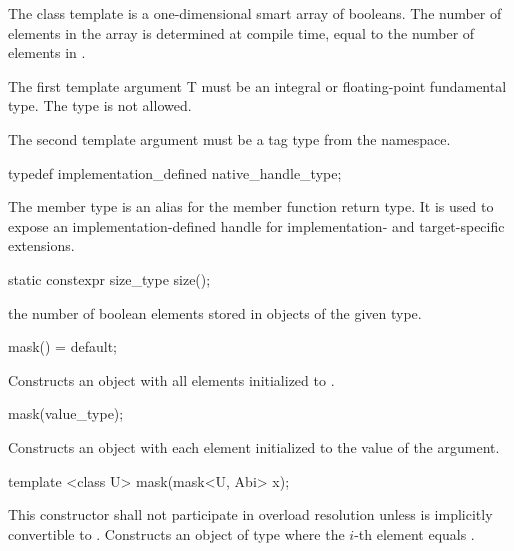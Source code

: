 

\pnum The class template \mask[<T, Abi>] is a one-dimensional smart array of booleans.
The number of elements in the array is determined at compile time, equal to the number of elements in \datapar[<T, Abi>].

\pnum The first template argument \type T must be an integral or floating-point fundamental type.
The type \bool is not allowed.

\pnum The second template argument  must be a tag type from the  namespace.

\begin{itemdecl}
typedef implementation_defined native_handle_type;
\end{itemdecl}
\begin{itemdescr}
  \pnum The  member type is an alias for the  member function return type.
  It is used to expose an implementation-defined handle for implementation- and target-specific extensions.
\end{itemdescr}

\begin{itemdecl}
static constexpr size_type size();
\end{itemdecl}
\begin{itemdescr}
  \pnum\returns the number of boolean elements stored in objects of the given \mask[<T, Abi>] type.
\end{itemdescr}

\begin{itemdecl}
mask() = default;
\end{itemdecl}
\begin{itemdescr}
  \pnum\effects Constructs an object with all elements initialized to .
\end{itemdescr}

\begin{itemdecl}
mask(value_type);
\end{itemdecl}
\begin{itemdescr}
  \pnum\effects Constructs an object with each element initialized to the value of the argument.
\end{itemdescr}

\begin{itemdecl}
template <class U> mask(mask<U, Abi> x);
\end{itemdecl}
\begin{itemdescr}
  \pnum\remarks This constructor shall not participate in overload resolution unless
    \datapar[<U, Abi>] is implicitly convertible to \datapar[<T, Abi>].
  \pnum\effects Constructs an object of type \mask where the $i$-th element equals  \foralli.
\end{itemdescr}

